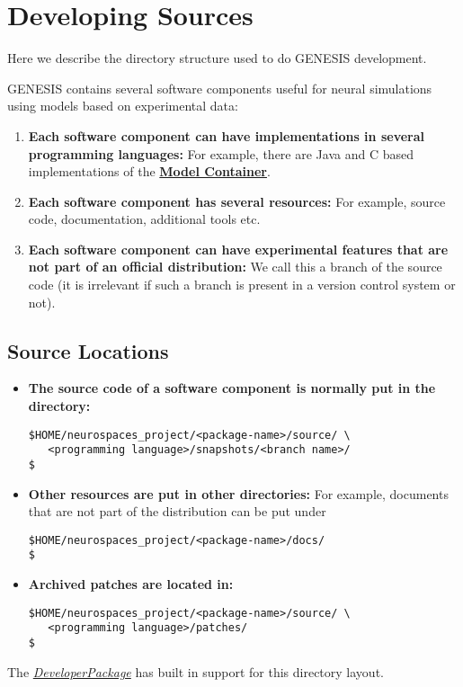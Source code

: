 \documentclass[12pt]{article}
\begin{document}
\section*{Developing Sources}

Here we describe the directory structure used to do GENESIS development.

GENESIS contains several software components useful for neural simulations using models based on experimental data:
\begin{enumerate}
\item {\bf Each software component can have implementations in several programming languages:} For example, there are Java and C based implementations of the \href{../model-container/model-container.tex}{\bf Model Container}.
\item {\bf Each software component has several resources:} For example, source code, documentation, additional tools etc.
\item {\bf Each software component can have experimental features that are not part of an official distribution:} We call this a branch of the source code (it is irrelevant if such a branch is present in a version control system or not). 
\end{enumerate}

\subsection*{Source Locations}

\begin{itemize}
\item {\bf The source code of a software component is normally put in the directory:}
\begin{verbatim}
$HOME/neurospaces_project/<package-name>/source/ \
   <programming language>/snapshots/<branch name>/
$
\end{verbatim}

\item {\bf Other resources are put in other directories:} For example, documents that are not part of the distribution can be put under
\begin{verbatim}
$HOME/neurospaces_project/<package-name>/docs/
$
\end{verbatim}

\item {\bf Archived patches are located in:}
\begin{verbatim}
$HOME/neurospaces_project/<package-name>/source/ \
   <programming language>/patches/ 
$
\end{verbatim}

\end{itemize}
The \href{../developer-package/developer-package.tex}{\it DeveloperPackage} has built in support for this directory layout.
\end{document}
